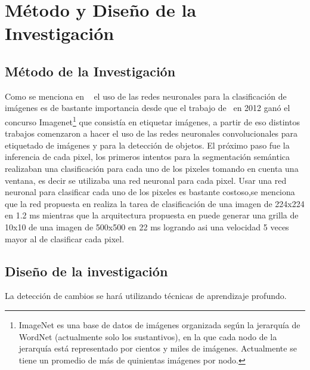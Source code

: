 \section{Método y Diseño de la Investigación}
\subsection{Método de la Investigación}
Como se menciona en ~\cite{long2015fully} el uso de las redes neuronales para la clasificación de imágenes es de bastante importancia desde que el trabajo de~\cite{krizhevsky2012imagenet} en 2012 ganó el concurso Imagenet\footnote{ImageNet es una base de datos de imágenes organizada según la jerarquía de WordNet (actualmente solo los sustantivos), en la que cada nodo de la jerarquía está representado por cientos y miles de imágenes. Actualmente se tiene un promedio de más de quinientas imágenes por nodo.} que consistía en etiquetar imágenes, a partir de eso distintos trabajos comenzaron a hacer el uso de las redes neuronales convolucionales para etiquetado de imágenes y para la detección de objetos.
El próximo paso fue la inferencia de cada pixel, los primeros intentos para la segmentación semántica~\cite{ning2005toward,   ciresan2012deep, farabet2013learning} realizaban una clasificación para cada uno de los pixeles tomando en cuenta una ventana, es decir se utilizaba una red neuronal para cada pixel. Usar una red neuronal para clasificar cada uno de los pixeles es bastante costoso,se menciona que la red propuesta en \cite{krizhevsky2012imagenet}  realiza la tarea de clasificación de una imagen de 224x224 en 1.2 ms mientras que la arquitectura propuesta en \cite{long2015fully} puede generar una grilla de 10x10 de una imagen de 500x500 en 22 ms logrando asi una velocidad 5 veces mayor al de clasificar cada pixel.

\subsection{Diseño de la investigación}
\label{sec:MetodologiaElvis}
La detección de cambios se hará utilizando técnicas de aprendizaje profundo.

